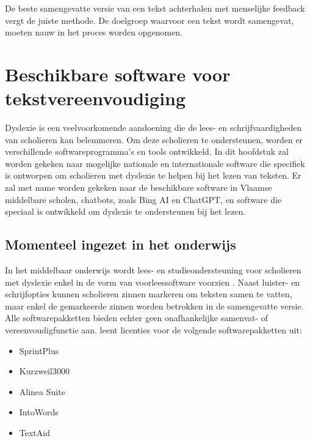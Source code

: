 De beste samengevatte versie van een tekst achterhalen met menselijke feedback vergt de juiste methode. De doelgroep waarvoor een tekst wordt samengevat, moeten nauw in het proces worden opgenomen.



\section{Beschikbare software voor tekstvereenvoudiging}

Dyslexie is een veelvoorkomende aandoening die de lees- en schrijfvaardigheden van scholieren kan belemmeren. Om deze scholieren te ondersteunen, worden er verschillende softwareprogramma's en tools ontwikkeld. In dit hoofdstuk zal worden gekeken naar mogelijke nationale en internationale software die specifiek is ontworpen om scholieren met dyslexie te helpen bij het lezen van teksten. Er zal met name worden gekeken naar de beschikbare software in Vlaamse middelbare scholen, chatbots, zoals Bing AI en ChatGPT, en software die speciaal is ontwikkeld om dyslexie te ondersteunen bij het lezen.

\subsection{Momenteel ingezet in het onderwijs}


In het middelbaar onderwijs wordt lees- en studieondersteuning voor scholieren met dyslexie enkel in de vorm van voorleessoftware voorzien \autocite{DeCraemer2018, OnderwijsVlaanderen2023}. Naast luister- en schrijfopties kunnen scholieren zinnen markeren om teksten samen te vatten, maar enkel de gemarkeerde zinnen worden betrokken in de samengevatte versie. Alle softwarepakketten bieden echter geen onafhankelijke samenvat- of vereenvoudigfunctie aan. \textcite{OnderwijsVlaanderen2023} leent licenties voor de volgende softwarepakketten uit:

\begin{itemize}
	\item SprintPlus
	\item Kurzweil3000
	\item Alinea Suite
	\item IntoWords
	\item TextAid
\end{itemize}

